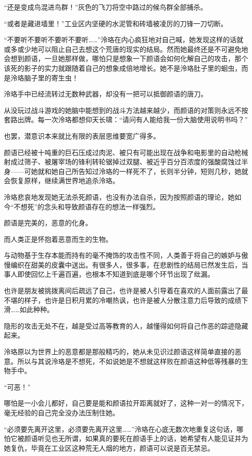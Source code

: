 \documentclass[UTF8, scheme = chinese, openany]{ctexbook}
\begin{document}
“还是变成鸟混进鸟群！”灰色的飞刀将空中路过的候鸟群全部捕杀。

“或者是藏进墙里！”工业区内坚硬的水泥管和砖墙被凌厉的刀锋一刀切断。

“不要听不要听不要听不要听……”泠珞在内心疯狂地对自己喊，她发现这样的话就或多或少地可以阻止自己去想这个荒唐的现实的结局。然而她最终还是不可避免地会想到颜语，一旦她那样做，哪怕只是想象一下颜语会如何化解自己的攻击，那个该死的影子的实力就跟随着自己的想象成倍地增长。她不是泠珞肚子里的蛔虫，而是泠珞脑子里的寄生虫！

泠珞手中已经流转过无数种武器，却没有一把可以抵御颜语的唐刀。

从没玩过战斗游戏的她脑中能想到的战斗方法越来越少，而颜语的对策则永远不按套路出牌。每一次泠珞都想仰天长啸：“请问有人能给我一份大脑使用说明书吗？”

也罢，潜意识本来就比有限的表层思维要宽广得多。

颜语已经被十吨重的巨石压成过肉泥、被只有可能出现在战争和电影里的自动枪械射成过筛子、被屠宰场的锋利转轮锯掉过双腿、被近乎百分百浓度的强酸腐蚀过半身——可她就和她自己所告知过泠珞的一样死不了，长则半分钟，短则几秒，她就会恢复原样，继续满世界地追杀泠珞。

泠珞悲哀地发现她无法杀死颜语，也没有办法自杀，因为按照颜语的理论，她如今“不想死”的念头和导致颜语存在的想法一样强烈。

颜语是完美的，恶意的化身。

而人类正是怀抱着恶意而生的生物。

与动物基于生存本能而持有的毫不掩饰的攻击性不同，人类善于将自己的嫉妒与傲慢编织在甜美的皮囊中送出。有很多人，很多事，在悲剧性的结局已然发生后，当事人即使回忆上千遍百遍，也根本不知道到底是哪个环节出现了纰漏。

也许是朋友被挑拨离间后疏远了自己，也许是被人引导着在喜欢的人面前露出了最不堪的样子，也许是日积月累的冷嘲热讽，也许是被人分散注意力后导致的成绩下滑……如此种种。

隐形的攻击无处不在，越是受过高等教育的人，越懂得如何将自己作恶的踪迹隐藏起来。

泠珞原以为世界上的恶意都是那般精巧的，她从未见识过颜语这样简单直接的恶意。所以与其说泠珞是不想死，不如说她是不想就这样败在颜语这种低等残暴的生物手中。

“可恶！”

哪怕是一小会儿都好，自己要是能和颜语拉开距离就好了，这种一对一的情况下，毫无经验的自己完全没办法压制住她。

“必须要先离开这里，必须要先离开这里……”泠珞在心底无数次地重复这句话，哪怕它被颜语听见也无所谓，如果真的要死在颜语手上的话，她希望有人能见证并为她复仇，毕竟在工业区这种荒无人烟的地方，颜语可以说是百无禁忌。
\end{document}
